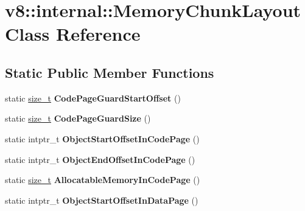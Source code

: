 \hypertarget{classv8_1_1internal_1_1MemoryChunkLayout}{}\section{v8\+:\+:internal\+:\+:Memory\+Chunk\+Layout Class Reference}
\label{classv8_1_1internal_1_1MemoryChunkLayout}
\subsection*{Static Public Member Functions}
\begin{DoxyCompactItemize}
\item 
\mbox{\label{classv8_1_1internal_1_1MemoryChunkLayout_a9d30134938befc82ddac2ad09ef59fab}} 
static \mbox{\hyperlink{classsize__t}{size\+\_\+t}} {\bfseries Code\+Page\+Guard\+Start\+Offset} ()
\item 
\mbox{\label{classv8_1_1internal_1_1MemoryChunkLayout_acacf0593e8c25c084c9a51f128f5f931}} 
static \mbox{\hyperlink{classsize__t}{size\+\_\+t}} {\bfseries Code\+Page\+Guard\+Size} ()
\item 
\mbox{\label{classv8_1_1internal_1_1MemoryChunkLayout_a4cf7829543e23a6ab0cffc39122833f1}} 
static intptr\+\_\+t {\bfseries Object\+Start\+Offset\+In\+Code\+Page} ()
\item 
\mbox{\label{classv8_1_1internal_1_1MemoryChunkLayout_a0f44fa1c87ac18c1ec5532a9706c2ca7}} 
static intptr\+\_\+t {\bfseries Object\+End\+Offset\+In\+Code\+Page} ()
\item 
\mbox{\label{classv8_1_1internal_1_1MemoryChunkLayout_a22c2db9d47c592f725cbeac6425dafba}} 
static \mbox{\hyperlink{classsize__t}{size\+\_\+t}} {\bfseries Allocatable\+Memory\+In\+Code\+Page} ()
\item 
\mbox{\label{classv8_1_1internal_1_1MemoryChunkLayout_ae15484232b6daea14ac11546902b704e}} 
static intptr\+\_\+t {\bfseries Object\+Start\+Offset\+In\+Data\+Page} ()
\item 

\end{DoxyCompactItemize}
